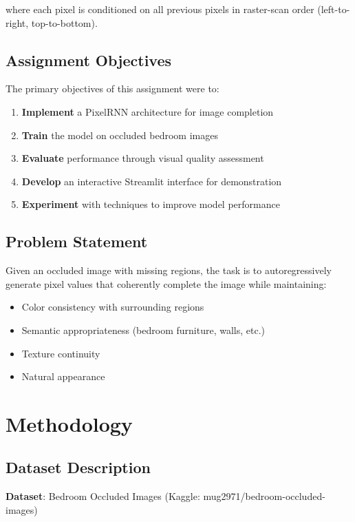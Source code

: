 \documentclass[12pt,a4paper]{article}
\begin{document}
where each pixel is conditioned on all previous pixels in raster-scan order (left-to-right, top-to-bottom).

\subsection{Assignment Objectives}

The primary objectives of this assignment were to:

\begin{enumerate}
    \item \textbf{Implement} a PixelRNN architecture for image completion
    \item \textbf{Train} the model on occluded bedroom images
    \item \textbf{Evaluate} performance through visual quality assessment
    \item \textbf{Develop} an interactive Streamlit interface for demonstration
    \item \textbf{Experiment} with techniques to improve model performance
\end{enumerate}

\subsection{Problem Statement}

Given an occluded image with missing regions, the task is to autoregressively generate pixel values that coherently complete the image while maintaining:
\begin{itemize}
    \item Color consistency with surrounding regions
    \item Semantic appropriateness (bedroom furniture, walls, etc.)
    \item Texture continuity
    \item Natural appearance
\end{itemize}

\section{Methodology}

\subsection{Dataset Description}

\textbf{Dataset}: Bedroom Occluded Images (Kaggle: mug2971/bedroom-occluded-images)
\end{document}
